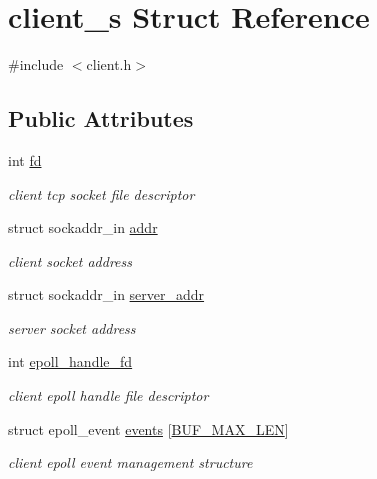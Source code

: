 \hypertarget{structclient__s}{\section{client\-\_\-s Struct Reference}
\label{structclient__s}
}


{\ttfamily \#include $<$client.\-h$>$}

\subsection*{Public Attributes}
\begin{DoxyCompactItemize}
\item 
int \hyperlink{structclient__s_a9babf0c4dea4b555e6b87a47f4ca98cd}{fd}
\begin{DoxyCompactList}\small\item\em client tcp socket file descriptor \end{DoxyCompactList}\item 
struct sockaddr\-\_\-in \hyperlink{structclient__s_a0462afe1661e70a0c69fa24f39387d0f}{addr}
\begin{DoxyCompactList}\small\item\em client socket address \end{DoxyCompactList}\item 
struct sockaddr\-\_\-in \hyperlink{structclient__s_a4cb8f28435762b205424d16ea39dcab3}{server\-\_\-addr}
\begin{DoxyCompactList}\small\item\em server socket address \end{DoxyCompactList}\item 
int \hyperlink{structclient__s_aadebb75dc03b9055f20d18e6a78865c4}{epoll\-\_\-handle\-\_\-fd}
\begin{DoxyCompactList}\small\item\em client epoll handle file descriptor \end{DoxyCompactList}\item 
struct epoll\-\_\-event \hyperlink{structclient__s_a06588602dcf6728b79196b73271edf97}{events} \mbox{[}\hyperlink{client_8h_aae114cdd7784a59af222f175dac6312b}{B\-U\-F\-\_\-\-M\-A\-X\-\_\-\-L\-E\-N}\mbox{]}
\begin{DoxyCompactList}\small\item\em client epoll event management structure \end{DoxyCompactList}\end{DoxyCompactItemize}


